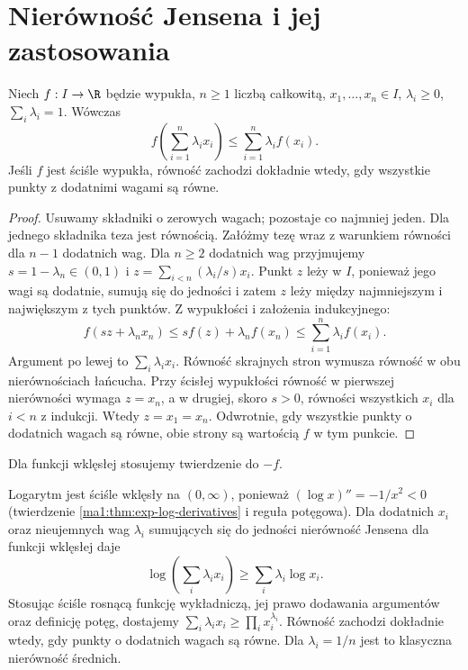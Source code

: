 \section{Nierówność Jensena i jej zastosowania}
\begin{twierdzenie}[Jensena]
\label{ma1:thm:jensen}
Niech $f:I\to\R$ będzie wypukła, $n\ge1$ liczbą całkowitą, $x_1,\ldots,x_n\in I$, $\lambda_i\ge0$, $\sum_i\lambda_i=1$. Wówczas
\[
 f\left(\sum_{i=1}^n\lambda_i x_i\right)\le
 \sum_{i=1}^n\lambda_i f(x_i).
\]
Jeśli $f$ jest ściśle wypukła, równość zachodzi dokładnie wtedy, gdy wszystkie punkty z dodatnimi wagami są równe.
\end{twierdzenie}
\begin{proof}
Usuwamy składniki o zerowych wagach; pozostaje co najmniej jeden. Dla jednego składnika teza jest równością. Załóżmy tezę wraz z warunkiem równości dla $n-1$ dodatnich wag. Dla $n\ge2$ dodatnich wag przyjmujemy $s=1-\lambda_n\in(0,1)$ i $z=\sum_{i<n}(\lambda_i/s)x_i$. Punkt $z$ leży w $I$, ponieważ jego wagi są dodatnie, sumują się do jedności i zatem $z$ leży między najmniejszym i największym z tych punktów. Z wypukłości i założenia indukcyjnego:
\[
 f(sz+\lambda_n x_n)\le s f(z)+\lambda_n f(x_n)
 \le\sum_{i=1}^n\lambda_i f(x_i).
\]
Argument po lewej to $\sum_i\lambda_i x_i$. Równość skrajnych stron wymusza równość w obu nierównościach łańcucha. Przy ścisłej wypukłości równość w pierwszej nierówności wymaga $z=x_n$, a w drugiej, skoro $s>0$, równości wszystkich $x_i$ dla $i<n$ z indukcji. Wtedy $z=x_1=x_n$. Odwrotnie, gdy wszystkie punkty o dodatnich wagach są równe, obie strony są wartością $f$ w tym punkcie.
\end{proof}
Dla funkcji wklęsłej stosujemy twierdzenie do $-f$.
\begin{przyklad}
\label{ma1:ex:jensen-amgm}
Logarytm jest ściśle wklęsły na $(0,\infty)$, ponieważ $(\log x)''=-1/x^2<0$ (twierdzenie \ref{ma1:thm:exp-log-derivatives} i reguła potęgowa). Dla dodatnich $x_i$ oraz nieujemnych wag $\lambda_i$ sumujących się do jedności nierówność Jensena dla funkcji wklęsłej daje
\[
 \log\left(\sum_i\lambda_i x_i\right)\ge\sum_i\lambda_i\log x_i.
\]
Stosując ściśle rosnącą funkcję wykładniczą, jej prawo dodawania argumentów oraz definicję potęg, dostajemy $\sum_i\lambda_i x_i\ge\prod_i x_i^{\lambda_i}$. Równość zachodzi dokładnie wtedy, gdy punkty o dodatnich wagach są równe. Dla $\lambda_i=1/n$ jest to klasyczna nierówność średnich.
\end{przyklad}

